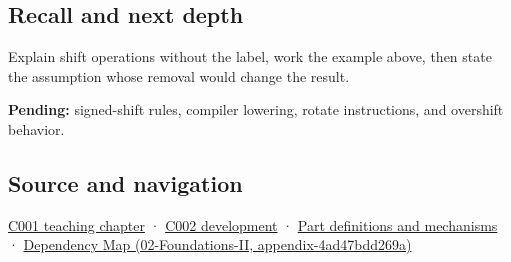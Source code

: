 \subsection{Recall and next depth}\label{appendix-73425b25118e-recall-and-next-depth}

Explain shift operations without the label, work the example above, then state the assumption whose removal would change the result.

\textbf{Pending:} signed-shift rules, compiler lowering, rotate instructions, and overshift behavior.

\subsection{Source and navigation}\label{appendix-73425b25118e-source-and-navigation}

\hyperref[01-foundations-i-ch001-from-a-signal-to-an-interpretation]{C001 teaching chapter} · \hyperref[01-foundations-i-ch001-arithmetic-becomes-a-policy]{C002 development} · \hyperref[appendix-fd090d982a15]{Part definitions and mechanisms} · \href{../02-Foundations-II/main.pdf\#nameddest=appendix-4ad47bdd269a}{Dependency Map (02-Foundations-II, appendix-4ad47bdd269a)}
